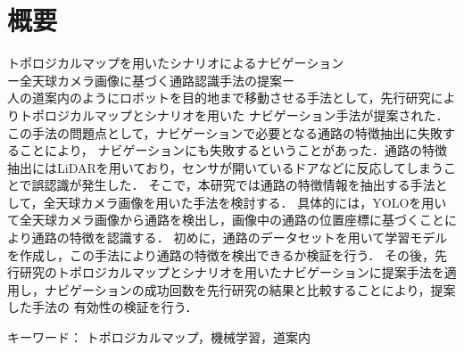 \documentclass[../main]{subfiles}
\begin{document}
 \chapter*{概要}
    {\LARGE トポロジカルマップを用いたシナリオによるナビゲーション\\
    ー全天球カメラ画像に基づく通路認識手法の提案ー}\\
    人の道案内のようにロボットを目的地まで移動させる手法として，先行研究によりトポロジカルマップとシナリオを用いた
    ナビゲーション手法が提案された．この手法の問題点として，ナビゲーションで必要となる通路の特徴抽出に失敗することにより，
    ナビゲーションにも失敗するということがあった．通路の特徴抽出にはLiDARを用いており，センサが開いているドアなどに反応してしまうことで誤認識が発生した．
    そこで，本研究では通路の特徴情報を抽出する手法として，全天球カメラ画像を用いた手法を検討する．
    具体的には，YOLOを用いて全天球カメラ画像から通路を検出し，画像中の通路の位置座標に基づくことにより通路の特徴を認識する．
    初めに，通路のデータセットを用いて学習モデルを作成し，この手法により通路の特徴を検出できるか検証を行う．
    その後，先行研究のトポロジカルマップとシナリオを用いたナビゲーションに提案手法を適用し，ナビゲーションの成功回数を先行研究の結果と比較することにより，提案した手法の
    有効性の検証を行う．
    
    キーワード：
    トポロジカルマップ，機械学習，道案内
\end{document}
